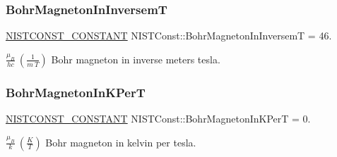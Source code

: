 \subsubsection{\texorpdfstring{Bohr\+Magneton\+In\+InversemT}{BohrMagnetonInInversemT}}
{\footnotesize\ttfamily \mbox{\hyperlink{_n_i_s_t_const_8hpp_a2b0fc1d7452373f816175dd86ce26729}{N\+I\+S\+T\+C\+O\+N\+S\+T\+\_\+\+C\+O\+N\+S\+T\+A\+NT}} N\+I\+S\+T\+Const\+::\+Bohr\+Magneton\+In\+InversemT = 46.}

$\frac{\mu_B}{hc} \ (\frac{1}{m\ T})$ Bohr magneton in inverse meters tesla. \mbox{\label{group___n_i_s_t_const-_bohr_magneton_gab847d7f91c3980277d352fd100d904f2}} 
\subsubsection{\texorpdfstring{Bohr\+Magneton\+In\+K\+PerT}{BohrMagnetonInKPerT}}
{\footnotesize\ttfamily \mbox{\hyperlink{_n_i_s_t_const_8hpp_a2b0fc1d7452373f816175dd86ce26729}{N\+I\+S\+T\+C\+O\+N\+S\+T\+\_\+\+C\+O\+N\+S\+T\+A\+NT}} N\+I\+S\+T\+Const\+::\+Bohr\+Magneton\+In\+K\+PerT = 0.}

$\frac{\mu_B}{k} \ (\frac{K}{T})$ Bohr magneton in kelvin per tesla. 